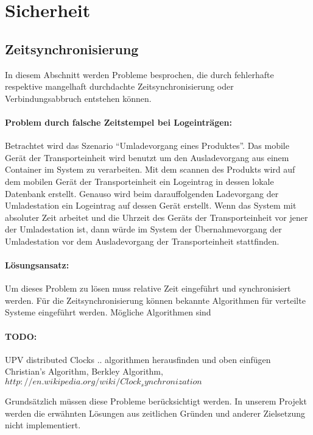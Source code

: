 \section{Sicherheit}

\subsection{Zeitsynchronisierung}

In diesem Abschnitt werden Probleme besprochen, die durch fehlerhafte respektive
mangelhaft durchdachte Zeitsynchronisierung oder Verbindungsabbruch entstehen
können.


\paragraph{Problem durch falsche Zeitstempel bei Logeinträgen:}
Betrachtet wird das Szenario ``Umladevorgang eines Produktes''. Das mobile
Gerät der Transporteinheit wird benutzt um den Ausladevorgang aus einem
Container im System zu verarbeiten. Mit dem scannen des Produkts wird auf dem
mobilen Gerät der Transporteinheit ein Logeintrag in dessen lokale Datenbank
erstellt. Genauso wird beim darauffolgenden Ladevorgang der Umladestation ein
Logeintrag auf dessen Gerät erstellt. Wenn das System mit absoluter Zeit
arbeitet und die Uhrzeit des Geräts der Transporteinheit vor jener der
Umladestation ist, dann würde im System der Übernahmevorgang der Umladestation
vor dem Ausladevorgang der Transporteinheit stattfinden.
\par
\paragraph{Lösungsansatz:}
Um dieses Problem zu lösen muss relative Zeit eingeführt und synchronisiert
werden. Für die Zeitsynchronisierung können bekannte Algorithmen für verteilte
Systeme eingeführt werden. Mögliche Algorithmen sind
\par

\paragraph{TODO:}
UPV distributed Clocks .. algorithmen herausfinden und oben einfügen\\ 

	Christian's Algorithm, Berkley Algorithm, 
	$http://en.wikipedia.org/wiki/Clock_synchronization$
\par

Grundsätzlich müssen diese Probleme berücksichtigt werden. In unserem
Projekt werden die erwähnten Lösungen aus zeitlichen Gründen und anderer
Zielsetzung nicht implementiert.
